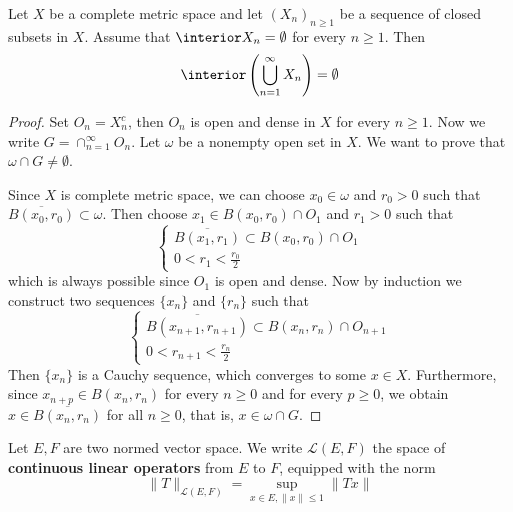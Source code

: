 \begin{thm}[Baire] Let $X$ be a complete metric space and let $(X_n)_{n\geq 1}$ be a sequence of closed subsets in $X$. Assume that $\interior X_n=\emptyset$ for every $n\geq 1$. Then
\begin{equation}
    \interior\left(\bigcup_{n=1}^{\infty}X_n\right)=\emptyset
\end{equation}
\end{thm}
\begin{proof}
Set $O_n=X_n^c$, then $O_n$ is open and dense in $X$ for every $n\geq 1$. Now we write $G=\cap_{n=1}^\infty O_n$. Let $\omega$ be a nonempty open set in $X$. We want to prove that $\omega\cap G\neq \emptyset$.

Since $X$ is complete metric space, we can choose $x_0\in \omega$ and $r_0>0$ such that $\overline{B(x_0,r_0)}\subset \omega$. Then choose $x_1\in B(x_0,r_0)\cap O_1$ and $r_1>0$ such that
\begin{equation}
    \begin{cases}
    \overline{B(x_1,r_1)}\subset B(x_0,r_0)\cap O_1\\
    0<r_1<\frac{r_0}{2}
    \end{cases}
\end{equation}
which is always possible since $O_1$ is open and dense. Now by induction we construct two sequences $\{x_n\}$ and $\{r_n\}$ such that
\begin{equation}
    \begin{cases}
    \overline{B(x_{n+1},r_{n+1})}\subset B(x_n,r_n)\cap O_{n+1}\\
    0<r_{n+1}<\frac{r_n}{2}
    \end{cases}
\end{equation}
Then $\{x_n\}$ is a Cauchy sequence, which converges to some $x\in X$. Furthermore, since $x_{n+p}\in B(x_n,r_n)$ for every $n\geq 0$ and for every $p\geq 0$, we obtain $x\in \overline{B(x_n,r_n)}$ for all $n\geq 0$, that is, $x\in \omega\cap G$.
\end{proof}

\begin{defn} Let $E,F$ are two normed vector space. We write $\mathcal{L}(E,F)$ the space of \textbf{continuous linear operators} from $E$ to $F$, equipped with the norm
\begin{equation}
    \|T\|_{\mathcal{L}(E,F)}=\sup_{x\in E, \|x\|\leq 1}\|Tx\|
\end{equation}
\end{defn}

